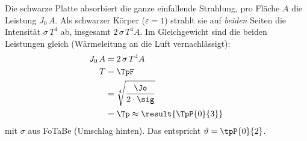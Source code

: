 \begin{center}
\end{center}

Die schwarze Platte absorbiert die ganze einfallende Strahlung, pro Fläche $A$ die Leistung $J_0\,A$. Als schwarzer Körper ($\varepsilon = 1$) strahlt sie auf \emph{beiden} Seiten die Intensität $\sigma\,T^4$ ab, insgesamt $2\,\sigma\,T^4 A$. Im Gleichgewicht sind die beiden Leistungen gleich (Wärmeleitung an die Luft vernachlässigt):
\begin{align}
 J_0\,A &= 2\,\sigma\,T^4 A \\
 T &= \TpF \\
   &= \sqrt[4]{\frac{\Jo}{2\cdot\sig}} \\
   &= \Tp \approx \result{\TpP{0}{3}}
\end{align}
mit $\sigma$ aus FoTaBe (Umschlag hinten). Das entspricht $\vartheta = \tpP{0}{2}$.
